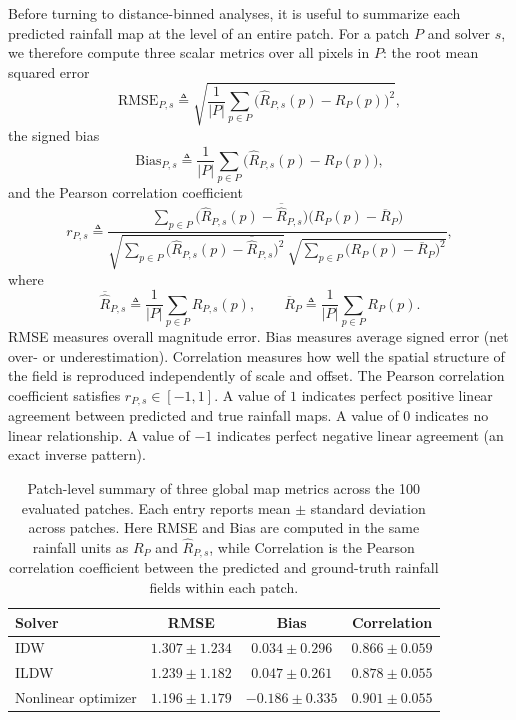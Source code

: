 \documentclass[11pt]{article}
\begin{document}
Before turning to distance-binned analyses, it is useful to summarize each predicted rainfall map at the level of an entire patch. For a patch $P$ and solver $s$, we therefore compute three scalar metrics over all pixels in $P$: the root mean squared error
\[
\mathrm{RMSE}_{P,s}\triangleq
\sqrt{\frac{1}{|P|}\sum_{p\in P}\bigl(\widehat{R}_{P,s}(p)-R_P(p)\bigr)^2},
\]
the signed bias
\[
\mathrm{Bias}_{P,s}\triangleq
\frac{1}{|P|}\sum_{p\in P}\bigl(\widehat{R}_{P,s}(p)-R_P(p)\bigr),
\]
and the Pearson correlation coefficient
\[
r_{P,s}\triangleq
\frac{\sum_{p\in P}\bigl(\widehat{R}_{P,s}(p)-\overline{\widehat{R}}_{P,s}\bigr)\bigl(R_P(p)-\overline{R}_P\bigr)}
{\sqrt{\sum_{p\in P}\bigl(\widehat{R}_{P,s}(p)-\overline{\widehat{R}}_{P,s}\bigr)^2}\,
\sqrt{\sum_{p\in P}\bigl(R_P(p)-\overline{R}_P\bigr)^2}},
\]
where
\[
\overline{\widehat{R}}_{P,s}\triangleq \frac{1}{|P|}\sum_{p\in P}\widehat{R}_{P,s}(p),
\qquad
\overline{R}_P\triangleq \frac{1}{|P|}\sum_{p\in P}R_P(p).
\]
RMSE measures overall magnitude error.
Bias measures average signed error (net over- or underestimation).
Correlation measures how well the spatial structure of the field is reproduced
independently of scale and offset.
The Pearson correlation coefficient satisfies $r_{P,s}\in[-1,1]$.
A value of $1$ indicates perfect positive linear agreement between predicted and
true rainfall maps.
A value of $0$ indicates no linear relationship.
A value of $-1$ indicates perfect negative linear agreement (an exact inverse
pattern).

\begin{table}[!htbp]
  \centering
  \begin{tabular}{lccc}
    \toprule
    Solver & RMSE & Bias & Correlation \\
    \midrule
    IDW & $1.307 \pm 1.234$ & $0.034 \pm 0.296$ & $0.866 \pm 0.059$ \\
    ILDW & $1.239 \pm 1.182$ & $0.047 \pm 0.261$ & $0.878 \pm 0.055$ \\
    Nonlinear optimizer & $1.196 \pm 1.179$ & $-0.186 \pm 0.335$ & $0.901 \pm 0.055$ \\
    \bottomrule
  \end{tabular}
  \caption{Patch-level summary of three global map metrics across the 100 evaluated patches. Each entry reports mean $\pm$ standard deviation across patches. Here RMSE and Bias are computed in the same rainfall units as $R_P$ and $\widehat{R}_{P,s}$, while Correlation is the Pearson correlation coefficient between the predicted and ground-truth rainfall fields within each patch.}
  \label{tab:patch_map_metrics}
\end{table}
\end{document}
